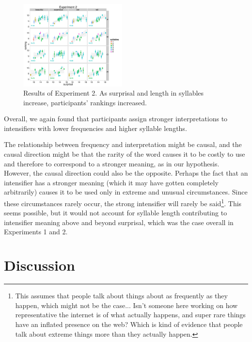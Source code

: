 \documentclass[10pt,letterpaper]{article}
\begin{document}
\begin{figure}[ht]
\begin{center}
\includegraphics[width=0.48\textwidth]{analysis_files_for_writeup/images/exp2-plot.png}
\end{center}
\caption{Results of Experiment 2. As surprisal and length in syllables increase, participants' rankings increased.} 
\label{exp2-plot}
\end{figure}

Overall, we again found that participants assign stronger interpretations to intensifiers with lower frequencies and higher syllable lengths.

The relationship between frequency and interpretation might be causal, and the causal direction might be that the rarity of the word causes it to be costly to use and therefore to correspond to a stronger meaning, as in our hypothesis.
However, the causal direction could also be the opposite.
Perhaps the fact that an intensifier has a stronger meaning (which it may have gotten completely arbitrarily) causes it to be used only in extreme and unusual circumstances.
Since these circumstances rarely occur, the strong intensifier will rarely be said\footnote{This assumes that people talk about things about as frequently as they happen, which might not be the case... Isn't someone here working on how representative the internet is of what actually happens, and super rare things have an inflated presence on the web? Which is kind of evidence that people talk about extreme things more than they actually happen.}.
This seems possible, but it would not account for syllable length contributing to intensifier meaning above and beyond surprisal,  which was the case overall in Experiments 1 and 2. 

\section{Discussion}

\end{document}

